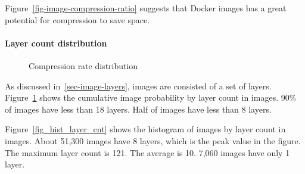 Figure~\ref{fig-image-compression-ratio} suggests that Docker images has a great potential for compression to save space.
\paragraph{Layer count distribution}

\begin{figure}[!t]
	\centering
	\caption{Compression rate distribution}
	\label{fig-layer-cnt}
\end{figure}

As discussed in~\ref{sec-image-layers}, images are consisted of a set of layers. Figure~\ref{fig-layer-cnt} shows the cumulative image probability by layer count in images. 90\% of images have less than 18 layers. Half of images have less than 8 layers. 

Figure~\ref{fig_hist_layer_cnt} shows the histogram of images by layer count in images. About 51,300 images have 8 layers, which is the peak value in the figure. The maximum layer count is 121. The average is 10. 7,060 images have only 1 layer. 

